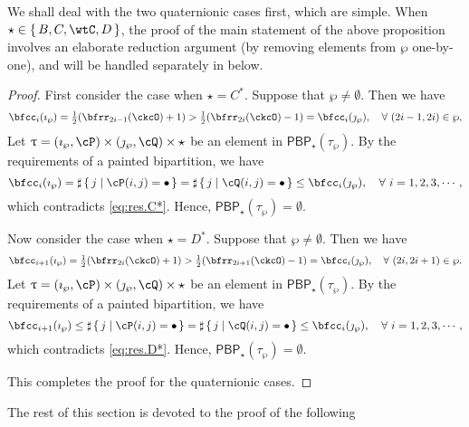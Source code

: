 \documentclass[12pt,a4paper]{amsart}
\numberwithin{equation}{section}
\theoremstyle{remark}
\def\half{{\tfrac{1}{2}}}
\def\PBP{\mathsf{PBP}}
\begin{document}
We shall deal with the two quaternionic cases first, which are simple. When $\star \in \set{B, C, \wtC, D}$, the proof of the main statement of the above proposition involves an elaborate reduction argument (by removing elements from $\wp$ one-by-one), and will be handled separately in  below.
\begin{proof}%

    \smallskip

  First consider the case when $\star = C^{*}$. Suppose that
  $\wp \neq \emptyset$. Then we have
  \begin{equation}\label{eq:res.C*}
    \bfcc_{i}(\imath_{\wp}) = \half(\bfrr_{2i-1}(\ckcO)+1)>
    \half(\bfrr_{2i}(\ckcO)-1) = \bfcc_{i}(\jmath_{\wp}),
    \quad \forall \,\, (2i-1, 2i)\in \wp,
  \end{equation}
  Let $\uptau = (\imath_{\wp}, \cP)\times (\jmath_{\wp},\cQ)\times \star$ be an element in $\PBP_{\star}(\tau_{\wp})$. By the requirements of a painted bipartition, we have
  \[
    \bfcc_{i}(\imath_{\wp}) = \sharp\set{j| \cP(i,j)=\bullet} = \sharp\set{j| \cQ(i,j)=\bullet} \leq \bfcc_{i}(\jmath_{\wp}), \quad \forall \,\, i=1,2,3,\cdots,
  \]
  which contradicts \eqref{eq:res.C*}. Hence, $\PBP_{\star}(\tau_{\wp})= \emptyset$.

  \smallskip

  Now consider the case when $\star = D^{*}$. Suppose that $\wp \neq \emptyset$.
  Then we have
  \begin{equation}\label{eq:res.D*}
    \bfcc_{i+1}(\imath_{\wp}) = \half(\bfrr_{2i}(\ckcO)+1)>
    \half(\bfrr_{2i+1}(\ckcO)-1) = \bfcc_{i}(\jmath_{\wp}),
    \quad \forall \,\, (2i, 2i+1)\in \wp.
  \end{equation}
  Let $\uptau = (\imath_{\wp}, \cP)\times (\jmath_{\wp},\cQ)\times \star$ be an element in $\PBP_{\star}(\tau_{\wp})$. By the requirements of a painted bipartition, we have
  \[
    \bfcc_{i+1}(\imath_{\wp}) \leq \sharp\set{j| \cP(i,j)=\bullet} =\sharp\set{j| \cQ(i,j)=\bullet} \leq \bfcc_{i}(\jmath_{\wp}), \quad \forall \,\, i = 1,2,3, \cdots,
  \]
  which contradicts \eqref{eq:res.D*}. Hence, $\PBP_{\star}(\tau_{\wp})= \emptyset$.

This completes the proof for the quaternionic cases.
\end{proof}

The rest of this section is devoted to the proof of the following


\def\PPm{\wp_{\downarrow}}
\def\uptaum{\uptau_{\downarrow}}
\end{document}
